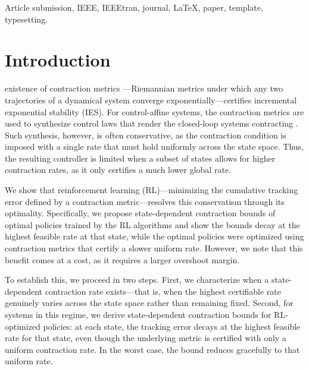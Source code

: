 \documentclass[lettersize,journal]{IEEEtran}
\begin{document}
\begin{IEEEkeywords}
Article submission, IEEE, IEEEtran, journal, \LaTeX, paper, template, typesetting.
\end{IEEEkeywords}

\section{Introduction}
 existence of contraction metrics \cite{LOHMILLER1998683}---Riemannian metrics under which any two trajectories of a dynamical system converge exponentially---certifies incremental exponential stability (IES).
For control-affine systems, the contraction metrics are used to synthesize control laws that render the closed-loop systems contracting \cite{manchester2017control}.
Such synthesis, however, is often conservative, as the contraction condition is imposed with a single rate that must hold uniformly across the state space.
Thus, the resulting controller is limited when a subset of states allows for higher contraction rates, as it only certifies a much lower global rate.

We show that reinforcement learning (RL)---minimizing the cumulative tracking error defined by a contraction metric---resolves this conservatism through its optimality.
Specifically, we propose state-dependent contraction bounds of optimal policies trained by the RL algorithms and show the bounds decay at the highest feasible rate at that state, while the optimal policies were optimized using contraction metrics that certify a slower uniform rate.
However, we note that this benefit comes at a cost, as it requires a larger overshoot margin.

To establish this, we proceed in two steps.
First, we characterize when a state-dependent contraction rate exists---that is, when the highest certifiable rate genuinely varies across the state space rather than remaining fixed.
Second, for systems in this regime, we derive state-dependent contraction bounds for RL-optimized policies: at each state, the tracking error decays at the highest feasible rate for that state, even though the underlying metric is certified with only a uniform contraction rate.
In the worst case, the bound reduces gracefully to that uniform rate.
\end{document}
